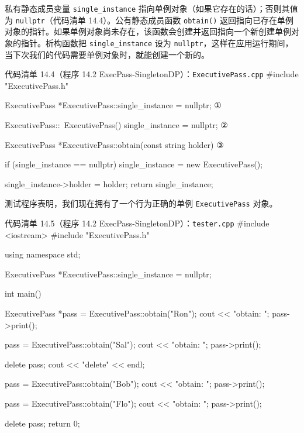 私有静态成员变量 \texttt{single\_\allowbreak{}instance} 指向单例对象（如果它存在的话）；否则其值为 \texttt{nullptr}（代码清单 14.4）。公有静态成员函数 \texttt{obtain()} 返回指向已存在单例对象的指针。如果单例对象尚未存在，该函数会创建并返回指向一个新创建单例对象的指针。析构函数把 \texttt{single\_\allowbreak{}instance} 设为 \texttt{nullptr}，这样在应用运行期间，当下次我们的代码需要单例对象时，就能创建一个新的。

\begin{codeboxt}{代码清单 14.4（程序 14.2 ExecPass-SingletonDP）：\texttt{Executive\allowbreak{}Pass.\allowbreak{}cpp}}
#include "ExecutivePass.h"

ExecutivePass *ExecutivePass::single_instance = nullptr;   ①

ExecutivePass::~ExecutivePass()
{ 
    single_instance = nullptr;                             ②
}

ExecutivePass *ExecutivePass::obtain(const string holder)  ③
{
    if (single_instance == nullptr)
    {
        single_instance = new ExecutivePass();
    }

    single_instance->holder = holder;
    return single_instance;
}
\end{codeboxt}
\par
{}\par
{}\par

测试程序表明，我们现在拥有了一个行为正确的单例 \texttt{Executive\allowbreak{}Pass} 对象。

\begin{codeboxt}{代码清单 14.5（程序 14.2 ExecPass-SingletonDP）：\texttt{tester.\allowbreak{}cpp}}
#include <iostream>
#include "ExecutivePass.h"

using namespace std;

ExecutivePass *ExecutivePass::single_instance = nullptr;

int main()
{
    ExecutivePass *pass = ExecutivePass::obtain("Ron");
    cout << "obtain: "; pass->print();

    pass = ExecutivePass::obtain("Sal");
    cout << "obtain: "; pass->print();

    delete pass;
    cout << "delete" << endl;

    pass = ExecutivePass::obtain("Bob");
    cout << "obtain: "; pass->print();

    pass = ExecutivePass::obtain("Flo");
    cout << "obtain: "; pass->print();

    delete pass;
    return 0;
}
\end{codeboxt}

